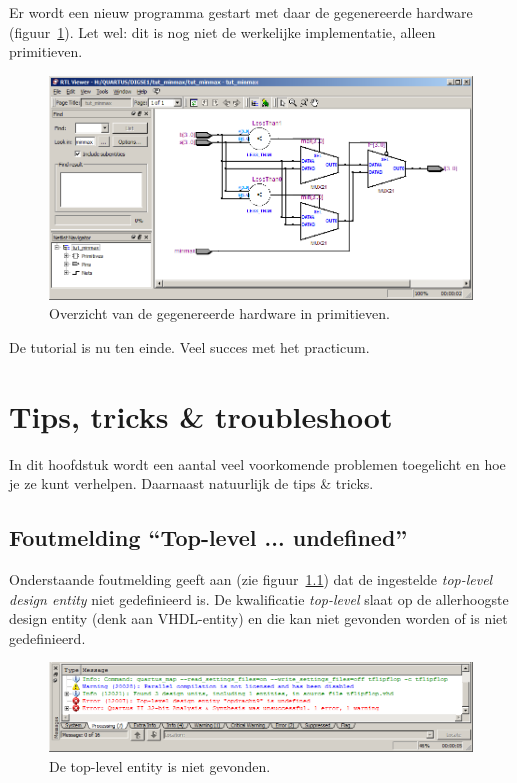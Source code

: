 \documentclass[a4paper,12pt,fleqn,twoside]{book}
\newif\ifbetaversion
\def\tutpicscale{0.455}
\begin{document}
Er wordt een nieuw programma gestart met daar de gegenereerde hardware (figuur~\ref{fig:101rtlviewer}). Let 
wel: dit is nog niet de werkelijke implementatie, alleen primitieven.
 
\begin{figure}[H]
\centering
\includegraphics[scale=\tutpicscale]{101rtlviewer.png}
\caption{Overzicht van de gegenereerde hardware in primitieven.}
\label{fig:101rtlviewer}
\end{figure}

De tutorial is nu ten einde. Veel succes met het practicum.


\ifbetaversion

\chapter{Tips, tricks \& troubleshoot}
In dit hoofdstuk wordt een aantal veel voorkomende problemen toegelicht en hoe
je ze kunt verhelpen. Daarnaast natuurlijk de tips \& tricks.


\section{Foutmelding ``Top-level ... undefined''}
\label{sec:fouttoplevel}
Onderstaande foutmelding geeft aan (zie figuur~\ref{fig:220undefinedtoplevelentity})
dat de ingestelde \textsl{top-level design entity} niet gedefinieerd is. De
kwalificatie \textsl{top-level} slaat op de allerhoogste design entity (denk aan
VHDL-entity) en die kan niet gevonden worden of is niet gedefinieerd.

\begin{figure}[H]
\centering
\includegraphics[scale=\tutpicscale]{220undefinedtoplevelentity.png}
\caption{De top-level entity is niet gevonden.}
\label{fig:220undefinedtoplevelentity}
\end{figure}
\end{document}
